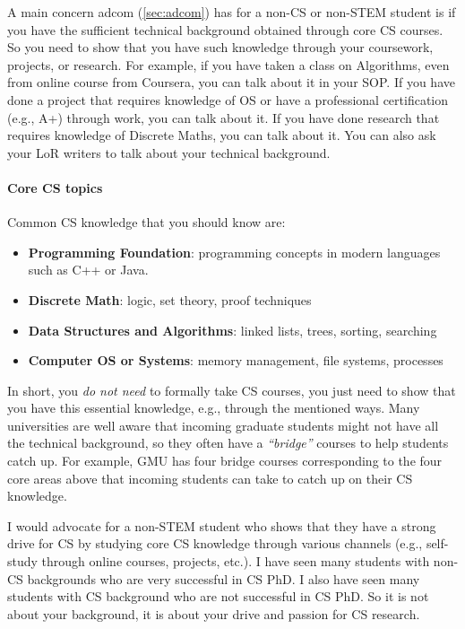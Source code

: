 \documentclass[oneside,11pt]{book}
\newenvironment{commentbox}[1][]{
  \small
  \begin{marker}[\faChessPawn{}]
    {\textbf{#1}}
  }{
  \end{marker}
}
\begin{document}
A main concern \acrshort{adcom} (\autoref{sec:adcom}) has for a non-CS or non-STEM student is if you have the sufficient technical background obtained through core CS courses.  So you need to show that you have such knowledge through your coursework, projects, or research.
For example, if you have taken a class on Algorithms, even from online course from Coursera, you can talk about it in your SOP.  If you have done a project that requires knowledge of OS or have a professional certification (e.g., A+) through work, you can talk about it.  If you have done research that requires knowledge of Discrete Maths, you can talk about it.  You can also ask your LoR writers to talk about your technical background.

\paragraph*{Core CS topics} Common CS knowledge that you should know are:

\begin{itemize}
  \item \textbf{Programming Foundation}: programming concepts in modern languages such as C++ or Java.
  \item \textbf{Discrete Math}: logic, set theory, proof techniques
  \item \textbf{Data Structures and Algorithms}: linked lists, trees, sorting, searching
  \item \textbf{Computer OS or Systems}: memory management, file systems, processes
\end{itemize}

In short, you \emph{do not need} to formally take CS courses, you just need to show that you have this essential knowledge, e.g., through the mentioned ways. Many universities are well aware that incoming graduate students might not have all the technical background, so they often have a \emph{``bridge''} courses to help students catch up.  For example, GMU has four bridge courses corresponding to the four core areas above that incoming students can take to catch up on their CS knowledge.


\begin{commentbox}
  I would advocate for a non-STEM student who shows that they have a strong drive for CS by studying core CS knowledge through various channels (e.g., self-study through online courses, projects, etc.).  I have seen many students with non-CS backgrounds who are very successful in CS PhD.  I also have seen many students with CS background who are not successful in CS PhD.  So it is not about your background, it is about your drive and passion for CS research.
\end{commentbox}
\end{document}
